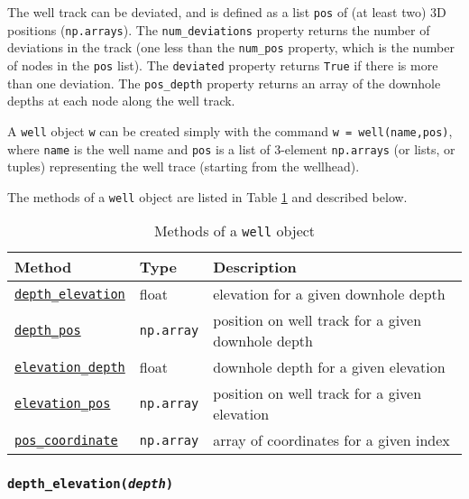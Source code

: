 The well track can be deviated, and is defined as a list \texttt{pos} of (at least two) 3D positions (\texttt{np.arrays}).  The \texttt{num\_deviations} property returns the number of deviations in the track (one less than the \texttt{num\_pos} property, which is the number of nodes in the \texttt{pos} list).  The \texttt{deviated} property returns \texttt{True} if there is more than one deviation.  The \texttt{pos\_depth} property returns an array of the downhole depths at each node along the well track.

A \texttt{well} object \texttt{w} can be created simply with the command \texttt{w = well(name,pos)}, where \texttt{name} is the well name and \texttt{pos} is a list of 3-element \texttt{np.arrays} (or lists, or tuples) representing the well trace (starting from the wellhead).

The methods of a \texttt{well} object are listed in Table \ref{tb:well_methods} and described below.

\begin{table}
  \begin{center}
    \begin{tabular}{|l|l|l|}
      \hline
      \textbf{Method} & \textbf{Type} & \textbf{Description}\\
      \hline
      \hyperref[sec:well:depth_elevation]{\texttt{depth\_elevation}} & float & elevation for a given downhole depth \\
      \hyperref[sec:well:depth_pos]{\texttt{depth\_pos}} & \texttt{np.array} & position on well track for a given downhole depth \\
      \hyperref[sec:well:elevation_depth]{\texttt{elevation\_depth}} & float & downhole depth for a given elevation \\
      \hyperref[sec:well:elevation_pos]{\texttt{elevation\_pos}} & \texttt{np.array} & position on well track for a given elevation \\
      \hyperref[sec:well:pos_coordinate]{\texttt{pos\_coordinate}} & \texttt{np.array} & array of coordinates for a given index \\
      \hline
    \end{tabular}
    \caption{Methods of a \texttt{well} object}
    \label{tb:well_methods}
  \end{center}
\end{table}

\subsubsection{\texttt{depth\_elevation(\emph{depth})}}
\label{sec:well:depth_elevation}

